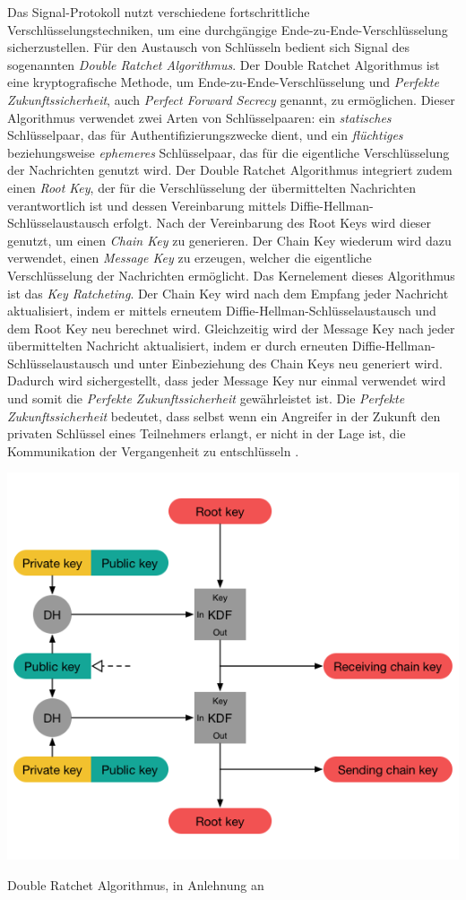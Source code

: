 Das Signal-Protokoll nutzt verschiedene fortschrittliche Verschlüsselungstechniken, um eine durchgängige Ende-zu-Ende-Verschlüsselung sicherzustellen. Für den Austausch von Schlüsseln bedient sich Signal des sogenannten \textit{Double Ratchet Algorithmus}. Der Double Ratchet Algorithmus ist eine kryptografische Methode, um Ende-zu-Ende-Verschlüsselung und \textit{Perfekte Zukunftssicherheit}, auch \textit{Perfect Forward Secrecy} genannt, zu ermöglichen. Dieser Algorithmus verwendet zwei Arten von Schlüsselpaaren: ein \textit{statisches} Schlüsselpaar, das für Authentifizierungszwecke dient, und ein \textit{flüchtiges} beziehungsweise \textit{ephemeres} Schlüsselpaar, das für die eigentliche Verschlüsselung der Nachrichten genutzt wird. Der Double Ratchet Algorithmus integriert zudem einen \textit{Root Key}, der für die Verschlüsselung der übermittelten Nachrichten verantwortlich ist und dessen Vereinbarung mittels Diffie-Hellman-Schlüsselaustausch erfolgt. Nach der Vereinbarung des Root Keys wird dieser genutzt, um einen \textit{Chain Key} zu generieren. Der Chain Key wiederum wird dazu verwendet, einen \textit{Message Key} zu erzeugen, welcher die eigentliche Verschlüsselung der Nachrichten ermöglicht. Das Kernelement dieses Algorithmus ist das \textit{Key Ratcheting}. Der Chain Key wird nach dem Empfang jeder Nachricht aktualisiert, indem er mittels erneutem Diffie-Hellman-Schlüsselaustausch und dem Root Key neu berechnet wird. Gleichzeitig wird der Message Key nach jeder übermittelten Nachricht aktualisiert, indem er durch erneuten Diffie-Hellman-Schlüsselaustausch und unter Einbeziehung des Chain Keys neu generiert wird. Dadurch wird sichergestellt, dass jeder Message Key nur einmal verwendet wird und somit die \textit{Perfekte Zukunftssicherheit} gewährleistet ist. Die \textit{Perfekte Zukunftssicherheit} bedeutet, dass selbst wenn ein Angreifer in der Zukunft den privaten Schlüssel eines Teilnehmers erlangt, er nicht in der Lage ist, die Kommunikation der Vergangenheit zu entschlüsseln \Parencite{Signal_DoubleRatchet}.

\begin{center}
    \captionsetup{type=figure}
    \includegraphics[width=1\linewidth]{images/double_ratchet.png}
    \caption{Double Ratchet Algorithmus, in Anlehnung an \cite{Signal_DoubleRatchet}}
    \label{fig:double_ratchet}
\end{center}
